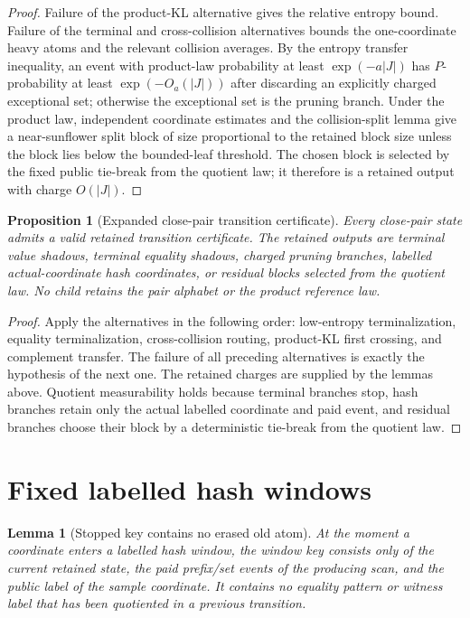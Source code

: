\documentclass[11pt]{article}
\newtheorem{lemma}[theorem]{Lemma}
\newtheorem{proposition}[theorem]{Proposition}
\theoremstyle{remark}
\begin{document}
\begin{proof}
Failure of the product-KL alternative gives the relative entropy bound.  Failure of the terminal and cross-collision alternatives bounds the one-coordinate heavy atoms and the relevant collision averages.  By the entropy transfer inequality, an event with product-law probability at least $\exp(-a|J|)$ has $P$-probability at least $\exp(-O_a(|J|))$ after discarding an explicitly charged exceptional set; otherwise the exceptional set is the pruning branch.  Under the product law, independent coordinate estimates and the collision-split lemma give a near-sunflower split block of size proportional to the retained block size unless the block lies below the bounded-leaf threshold.  The chosen block is selected by the fixed public tie-break from the quotient law; it therefore is a retained output with charge $O(|J|)$.
\end{proof}

\begin{proposition}[Expanded close-pair transition certificate]\label{prop:app-close-pair-certificate}
Every close-pair state admits a valid retained transition certificate.  The retained outputs are terminal value shadows, terminal equality shadows, charged pruning branches, labelled actual-coordinate hash coordinates, or residual blocks selected from the quotient law.  No child retains the pair alphabet or the product reference law.
\end{proposition}

\begin{proof}
Apply the alternatives in the following order: low-entropy terminalization, equality terminalization, cross-collision routing, product-KL first crossing, and complement transfer.  The failure of all preceding alternatives is exactly the hypothesis of the next one.  The retained charges are supplied by the lemmas above.  Quotient measurability holds because terminal branches stop, hash branches retain only the actual labelled coordinate and paid event, and residual branches choose their block by a deterministic tie-break from the quotient law.
\end{proof}

\section{Fixed labelled hash windows}\label{app:hash}

\begin{lemma}[Stopped key contains no erased old atom]\label{lem:app-hash-key-clean}
At the moment a coordinate enters a labelled hash window, the window key consists only of the current retained state, the paid prefix/set events of the producing scan, and the public label of the sample coordinate.  It contains no equality pattern or witness label that has been quotiented in a previous transition.
\end{lemma}
\end{document}
